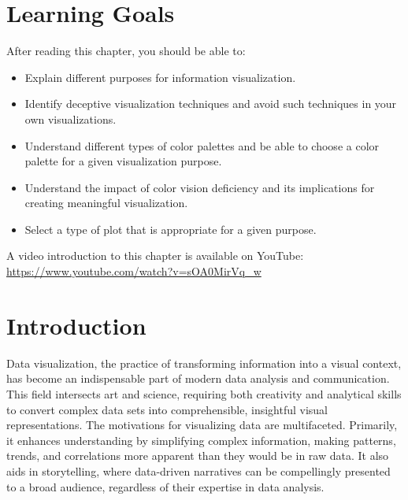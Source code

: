 %
%
\section*{Learning Goals}

After reading this chapter, you should be able to:
\begin{itemize}
   \item Explain different purposes for information visualization.
   \item Identify deceptive visualization techniques and avoid such techniques in your own visualizations.
   \item Understand different types of color palettes and be able to choose a color palette for a given visualization purpose.
   \item Understand the impact of color vision deficiency and its implications for creating meaningful visualization.
   \item Select a type of plot that is appropriate for a given purpose.
\end{itemize}

\begin{advanced}
\begin{videobox}
A video introduction to this chapter is available on YouTube:\\

\url{https://www.youtube.com/watch?v=sOA0MirVq_w}
\end{videobox}
\end{advanced}


\section{Introduction}

Data visualization, the practice of transforming information into a visual context, has become an indispensable part of modern data analysis and communication. This field intersects art and science, requiring both creativity and analytical skills to convert complex data sets into comprehensible, insightful visual representations. The motivations for visualizing data are multifaceted. Primarily, it enhances understanding by simplifying complex information, making patterns, trends, and correlations more apparent than they would be in raw data. It also aids in storytelling, where data-driven narratives can be compellingly presented to a broad audience, regardless of their expertise in data analysis.

